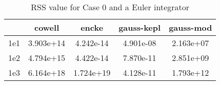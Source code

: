 \begin{table}
\centering
\begin{tabular}{|c|c|c|c|c|}
\hline
 & cowell & encke & gauss-kepl & gauss-mod \\
\hline
1e1 & 3.903e+14 & 4.242e-14 & 4.901e-08 & 2.163e+07 \\
\hline
1e2 & 4.794e+15 & 4.422e-14 & 7.870e-11 & 2.851e+09 \\
\hline
1e3 & 6.164e+18 & 1.724e+19 & 4.128e-11 & 1.793e+12 \\
\hline
\end{tabular}
\caption{RSS value for Case 0 and a Euler integrator}
\label{table:tab:keplerapprox_rss_C0_Euler}
\end{table}
